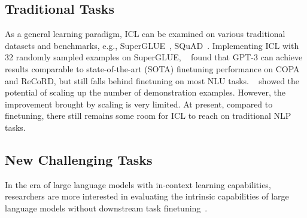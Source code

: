 
\subsection{Traditional Tasks}
As a general learning paradigm, ICL can be examined on various traditional datasets and benchmarks, e.g., SuperGLUE~\cite{superglue}, SQuAD~\cite{squad}. 
Implementing ICL with 32 randomly sampled examples on SuperGLUE, ~\citet{gpt3} found that GPT-3 can achieve results comparable to state-of-the-art (SOTA) finetuning performance on COPA and ReCoRD, but still falls behind finetuning on most NLU tasks.
~\citet{hao2022structured} showed the potential of scaling up the number of demonstration examples. However, the improvement brought by scaling is very limited. At present, compared to finetuning, there still remains some room for ICL to reach on traditional NLP tasks.



% 


\subsection{New Challenging Tasks}
In the era of large language models with in-context learning capabilities, researchers are more interested in evaluating the intrinsic capabilities of large language models without downstream task finetuning~\cite{foundation}.

